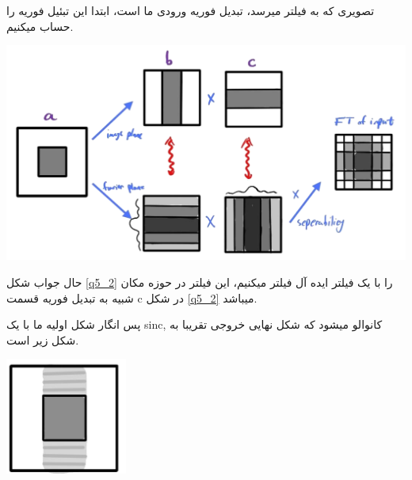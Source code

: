 \begin{qsolve}[]
    تصویری که به فیلتر میرسد، تبدیل فوریه ورودی ما است، ابتدا این تبئیل فوریه را حساب میکنیم.
    \begin{center}
        \includegraphics*[width=0.8\linewidth]{pics/q5_2_ans_1.png}
        \label{q5_2}
    \end{center}
    حال جواب شکل \ref*{q5_2} را با یک فیلتر ایده آل فیلتر میکنیم، این فیلتر در حوزه مکان شبیه به 
    تبدیل فوریه قسمت c در شکل \ref*{q5_2} میباشد. 

    پس انگار شکل اولیه ما با یک sinc, کانوالو میشود که شکل نهایی خروجی تقریبا به شکل زیر است.

    \begin{center}
        \includegraphics*[width=4cm]{pics/q5_2_ans_2.png}
    \end{center}
\end{qsolve}